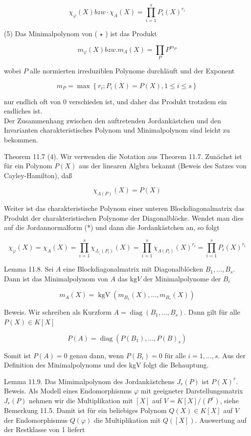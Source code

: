 \documentclass[10pt, letterpaper]{article}
\begin{document}
$$
\chi_{\varphi}(X) b z w \cdot \chi_{A}(X)=\prod_{i=1}^{s} P_{i}(X)^{r_{i}}
$$

(5) Das Minimalpolynom von ( $\star$ ) ist das Produkt

$$
m_{\varphi}(X) b z w . m_{A}(X)=\prod_{P} P^{m_{P}}
$$

wobei $P$ alle normierten irreduziblen Polynome durchläuft und der Exponent

$$
m_{P}=\max \left\{r_{i} ; P_{i}(X)=P(X), 1 \leq i \leq s\right\}
$$

nur endlich oft von 0 verschieden ist, und daher das Produkt trotzdem ein endliches ist.\\
Der Zusammenhang zwischen den auftretenden Jordankästchen und den Invarianten charakteristisches Polynom und Minimalpolynom sind leicht zu bekommen.

Theorem 11.7 (4). Wir verwenden die Notation aus Theorem 11.7. Zunächst ist für ein Polynom $P(X)$ aus der linearen Algbra bekannt (Beweis des Satzes von Cayley-Hamilton), daß

$$
\chi_{\Lambda(P)}(X)=P(X)
$$

Weiter ist das charakteristische Polynom einer unteren Blockdiagonalmatrix das Produkt der charakteristischen Polynome der Diagonalblöcke. Wendet man dies auf die Jordannormalform (*) und dann die Jordankästchen an, so folgt

$$
\chi_{\varphi}(X)=\chi_{A}(X)=\prod_{i=1}^{s} \chi_{J_{r_{i}}\left(P_{i}\right)}(X)=\prod_{i=1}^{s} \chi_{\Lambda\left(P_{i}\right)}(X)^{r_{i}}=\prod_{i=1}^{s} P_{i}(X)^{r_{i}}
$$

Lemma 11.8. Sei $A$ eine Blockdiagonalmatrix mit Diagonalblöcken $B_{1}, \ldots, B_{s}$. Dann ist das Minimalpolynom von $A$ das $\mathrm{kg} V$ der Minimalpolynome der $B_{i}$

$$
m_{A}(X)=\operatorname{kgV}\left(m_{B_{1}}(X), \ldots, m_{B_{s}}(X)\right)
$$

Beweis. Wir schreiben als Kurzform $A=\operatorname{diag}\left(B_{1}, \ldots, B_{s}\right)$. Dann gilt für alle $P(X) \in K[X]$

$$
P(A)=\operatorname{diag}\left(P\left(B_{1}\right), \ldots, P(B)_{s}\right)
$$

Somit ist $P(A)=0$ genau dann, wenn $P\left(B_{i}\right)=0$ für alle $i=1, \ldots, s$. Aus der Definition des Minimalpolynoms und des kgV folgt die Behauptung.

Lemma 11.9. Das Mimimalpolynom des Jordankästchens $J_{r}(P)$ ist $P(X)^{r}$.\\
Beweis. Als Modell eines Endomorphismus $\varphi$ mit geeigneter Darstellungsmatrix $J_{r}(P)$ nehmen wir die Multiplikation mit $[X]$ auf $V=K[X] /\left(P^{r}\right)$, siehe Bemerkung 11.5. Damit ist für ein beliebiges Polynom $Q(X) \in K[X]$ auf $V$ der Endomorphismus $Q(\varphi)$ die Multiplikation mit $Q([X])$. Auswertung auf der Restklasse von 1 liefert
\end{document}

